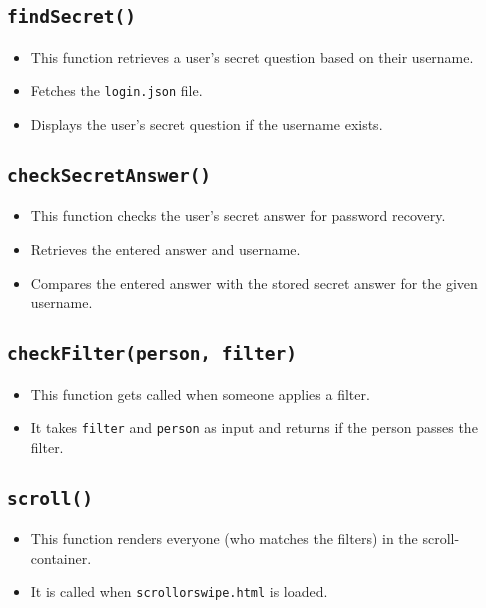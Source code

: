 \documentclass[12pt,a4paper]{article}
\begin{document}
\subsection{\texttt{findSecret()}}
\begin{itemize}
    \item This function retrieves a user's secret question based on their username.
    \item Fetches the \texttt{login.json} file.
    \item Displays the user's secret question if the username exists.
\end{itemize}

    \subsection{\texttt{checkSecretAnswer()}}
\begin{itemize}
    \item This function checks the user's secret answer for password recovery.
    \item Retrieves the entered answer and username.
    \item Compares the entered answer with the stored secret answer for the given username.
\end{itemize}

\subsection{\texttt{checkFilter(person, filter)}}
\begin{itemize}
    \item This function gets called when someone applies a filter.
    \item It takes \texttt{filter} and \texttt{person} as input and returns if the person passes the filter.
\end{itemize}


\subsection{\texttt{scroll()}}
\begin{itemize}
    \item This function renders everyone (who matches the filters) in the scroll-container.
    \item It is called when \texttt{scroll\textunderscore or\textunderscore swipe.html} is loaded.
\end{itemize}
\end{document}
